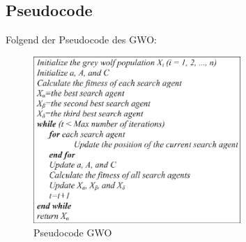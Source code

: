 \subsection{Pseudocode}
Folgend der Pseudocode des GWO:
\begin{figure}[ht]
    \begin{center}
        \includegraphics[width=0.7\textwidth]{assets/img/Pseudo-code-of-Grey-Wolf-Optimization-GWO-algorithm.png}
        \caption[Pseudocode GWO]{Pseudocode GWO \cite{MIRJALILI201446}}
        \label{gwo_pseudocode}
    \end{center}
\end{figure}